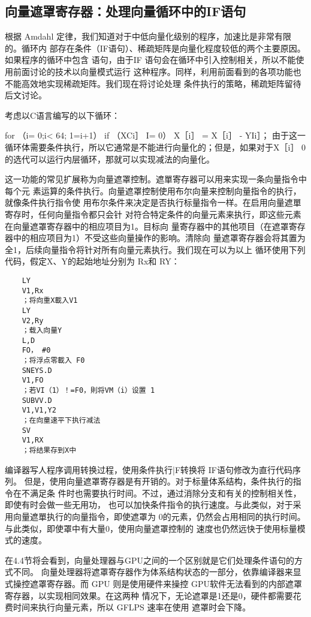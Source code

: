 \subsection{向量遮罩寄存器：处理向量循环中的IF语句}

根据 Amdahl 定律，我们知道对于中低向量化级别的程序，加速比是非常有限的。循环内
部存在条件（IF语句）、稀疏矩阵是向量化程度较低的两个主要原因。如果程序的循环中包含
语句，由于IF 语句会在循环中引入控制相关，所以不能使用前面讨论的技术以向量模式运行
这种程序。同样，利用前面看到的各项功能也不能高效地实现稀疏矩阵。我们现在将讨论处理
条件执行的策略，稀疏矩阵留待后文讨论。

考虑以C语言编写的以下循环：

for （i= 0;i< 64; 1=i+1）
if （XCi］ I= 0）
X［i］ = X［i］ - YIi］；
由于这一循环体需要条件执行，所以它通常是不能进行向量化的；但是，如果对于X［i］ 0
的选代可以运行内层循环，那就可以实现减法的向量化。

这一功能的常见扩展称为向量遮罩控制。遮單寄存器可以用来实现一条向量指令中每个元
素运算的条件执行。向量遮罩控制使用布尔向量来控制向量指令的执行，就像条件执行指令使
用布尔条件来决定是否执行标量指令一样。在启用向量遮單寄存时，任何向量指令都只会针
对符合特定条件的向量元素来执行，即这些元素在向量遮罩寄存器中的相应项目为1。目标向
量寄存器中的其他项目（在遮罩寄存器中的相应项目为1）不受这些向量操作的影响。清除向
量遮罩寄存器会将其置为全1，后续向量指令将针对所有向量元素执行。我们现在可以为以上
循环使用下列代码，假定X、Y的起始地址分别为 Rx和 RY：
\begin{verbatim}
    LY
    V1,Rx
    ；将向重X載入V1
    LY
    V2,Ry
    ；载入向量Y
    L,D
    FO， #0
    ；将浮点零載入 F0
    SNEYS.D
    V1,FO
    ；若VI（1）！=F0，則将VM（i）设置 1
    SUBVV.D
    V1,V1,Y2
    ；在向童速平下执行减法
    SV
    V1,RX
    ；将结果存到X中
\end{verbatim}
编译器写人程序调用转换过程，使用条件执行|F转换将 IF语句修改为直行代码序列。
但是，使用向量遮罩寄存器是有开销的。对于标量体系结构，条件执行的指令在不满足条
件时也需要执行时间。不过，通过消除分支和有关的控制相关性，即使有时会做一些无用功，
也可以加快条件指令的执行速度。与此类似，对于采用向量遮單执行的向量指令，即使遮罩为
0的元素，仍然会占用相同的执行时间。与此类似，即使罩中有大量0，使用向量遮罩控制的
速度也仍然远快于使用标量模式的速度。

在4.4节将会看到，向量处理器与GPU之间的一个区别就是它们处理条件语句的方式不同。
向量处理器将遮罩寄存器作为体系结构状态的一部分，依靠编译器来显式操控遮罩寄存器。而
GPU 则是使用硬件来操控 GPU软件无法看到的内部遮罩寄存器，以实现相同效果。在这两种
情况下，无论遮罩是1还是0，硬件都需要花费时间来执行向量元素，所以 GFLPS 速率在使用
遮罩时会下降。

